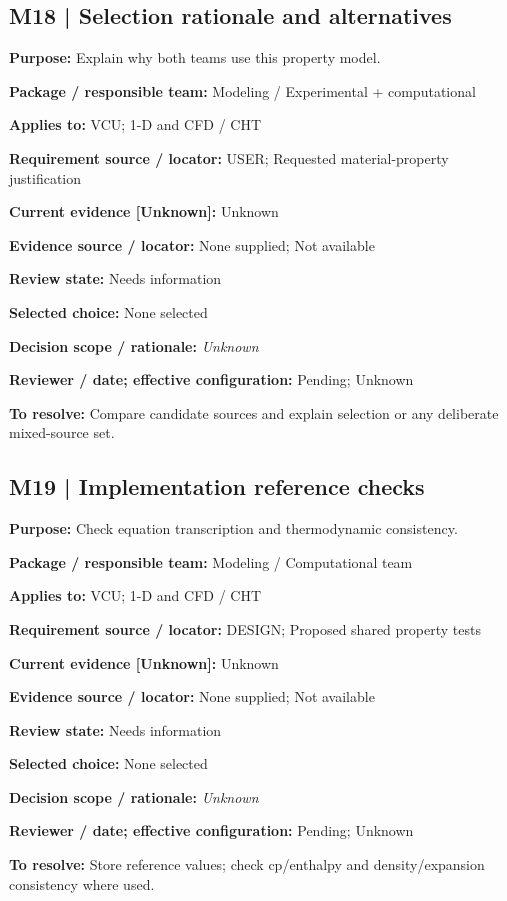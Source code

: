 \documentclass[11pt]{article}
\begin{document}
\par\noindent\begin{minipage}{\textwidth}\small\setlength{\parskip}{2pt}
\subsection*{M18 | Selection rationale and alternatives}
\textbf{Purpose:} Explain why both teams use this property model.\par
\textbf{Package / responsible team:} Modeling / Experimental + computational\par
\textbf{Applies to:} VCU; 1-D and CFD / CHT\par
\textbf{Requirement source / locator:} USER; Requested material-property justification\par
\textbf{Current evidence [Unknown]:} Unknown\par
\textbf{Evidence source / locator:} None supplied; Not available\par
\textbf{Review state:} Needs information\par
\textbf{Selected choice:} None selected\par
\textbf{Decision scope / rationale:} \textit{Unknown}\par
\textbf{Reviewer / date; effective configuration:} Pending; Unknown\par
\textbf{To resolve:} Compare candidate sources and explain selection or any deliberate mixed-source set.\par
\end{minipage}\par\vspace{5pt}
\par\noindent\begin{minipage}{\textwidth}\small\setlength{\parskip}{2pt}
\subsection*{M19 | Implementation reference checks}
\textbf{Purpose:} Check equation transcription and thermodynamic consistency.\par
\textbf{Package / responsible team:} Modeling / Computational team\par
\textbf{Applies to:} VCU; 1-D and CFD / CHT\par
\textbf{Requirement source / locator:} DESIGN; Proposed shared property tests\par
\textbf{Current evidence [Unknown]:} Unknown\par
\textbf{Evidence source / locator:} None supplied; Not available\par
\textbf{Review state:} Needs information\par
\textbf{Selected choice:} None selected\par
\textbf{Decision scope / rationale:} \textit{Unknown}\par
\textbf{Reviewer / date; effective configuration:} Pending; Unknown\par
\textbf{To resolve:} Store reference values; check cp/enthalpy and density/expansion consistency where used.\par
\end{minipage}\par\vspace{5pt}
\end{document}
